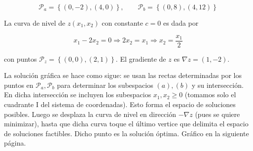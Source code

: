 \documentclass[12pt]{article}
\begin{document}
\begin{equation*}
    \mathcal{P}_a = \left\{ (0, -2), (4, 0) \right\}, \qquad \mathcal{P}_b 
    = \left\{ (0, 8), (4, 12) \right\} 
\end{equation*}

La curva de nivel de $z(x_1, x_2)$ con constante $c = 0$ es dada por

\begin{equation*}
    x_1 - 2x_2 = 0 \Rightarrow 2x_2 = x_1 \Rightarrow x_2 = \frac{x_1}{2}
\end{equation*}

con puntos $\mathcal{P}_z = \left\{ (0, 0), (2, 1) \right\} $. El gradiente de
$z$ es $\nabla z = (1, -2)$. 

La solución gráfica se hace como sigue: se usan las rectas determinadas por los
puntos en $\mathcal{P}_a, \mathcal{P}_b$ para determinar los subespacios $(a),
(b)$ y su intersección. En dicha intersección se incluyen los subespacios $x_1,
x_2 \geq 0$ (tomamos solo el cuadrante I del sistema de coordenadas). Esto forma
el espacio de soluciones posibles. Luego se desplaza la curva de nivel en
dirección $- \nabla z$ (pues se quiere minimizar), hasta que dicha curva toque
el último vertice que delimita el espacio de soluciones factibles. Dicho punto 
es la solución óptima. Gráfico en la siguiente página.
\end{document}
